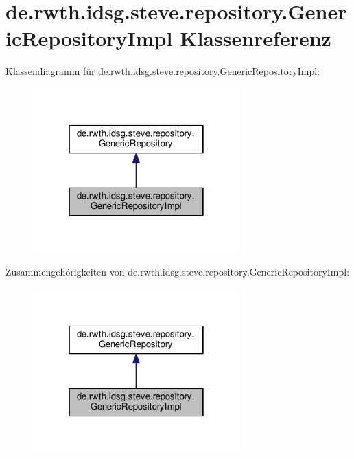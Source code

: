 \hypertarget{classde_1_1rwth_1_1idsg_1_1steve_1_1repository_1_1_generic_repository_impl}{\section{de.\-rwth.\-idsg.\-steve.\-repository.\-Generic\-Repository\-Impl Klassenreferenz}
\label{classde_1_1rwth_1_1idsg_1_1steve_1_1repository_1_1_generic_repository_impl}
}


Klassendiagramm für de.\-rwth.\-idsg.\-steve.\-repository.\-Generic\-Repository\-Impl\-:
\nopagebreak
\begin{figure}[H]
\begin{center}
\leavevmode
\includegraphics[width=226pt]{classde_1_1rwth_1_1idsg_1_1steve_1_1repository_1_1_generic_repository_impl__inherit__graph}
\end{center}
\end{figure}


Zusammengehörigkeiten von de.\-rwth.\-idsg.\-steve.\-repository.\-Generic\-Repository\-Impl\-:
\nopagebreak
\begin{figure}[H]
\begin{center}
\leavevmode
\includegraphics[width=226pt]{classde_1_1rwth_1_1idsg_1_1steve_1_1repository_1_1_generic_repository_impl__coll__graph}
\end{center}
\end{figure}

